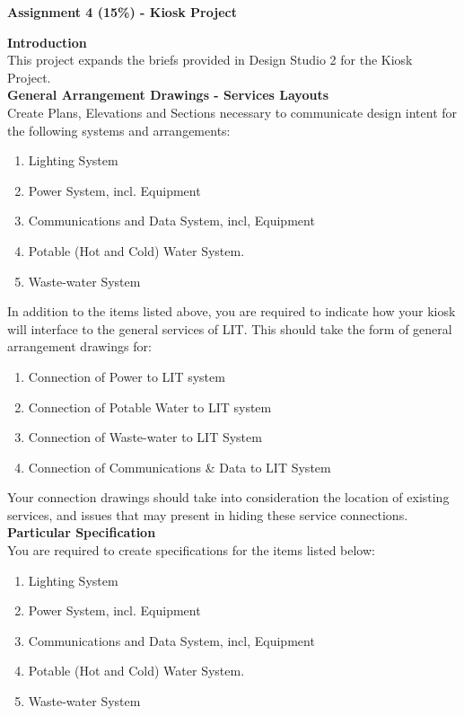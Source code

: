 
	
\begin{flushleft}
\Large\textbf{Assignment 4 (15\%) - Kiosk Project}\\
\end{flushleft}


\textbf{Introduction}\\
This project expands the briefs provided in Design Studio 2 for the Kiosk Project.\\

\textbf{General Arrangement Drawings - Services Layouts }\\
Create Plans, Elevations and Sections necessary to communicate design intent for the following systems and arrangements:

\begin{enumerate}
	\item Lighting System
	\item Power System, incl. Equipment
	\item Communications and Data System, incl, Equipment
	\item Potable (Hot and Cold) Water System.
	\item Waste-water System
\end{enumerate}

In addition to the items listed above, you are required to indicate how your kiosk will interface to the general services of LIT.  This should take the form of general arrangement drawings for:
\begin{enumerate}
	\item Connection of Power to LIT system
	\item Connection of Potable Water to LIT system
	\item Connection of Waste-water to LIT System
	\item Connection of Communications \& Data to LIT System
\end{enumerate}

Your connection drawings should take into consideration the location of existing services, and issues that may present in hiding these service connections.\\

\textbf{Particular Specification}\\
You are required to create specifications for the items listed below:
\begin{enumerate}
	\item Lighting System
	\item Power System, incl. Equipment
	\item Communications and Data System, incl, Equipment
	\item Potable (Hot and Cold) Water System.
	\item Waste-water System
\end{enumerate}

